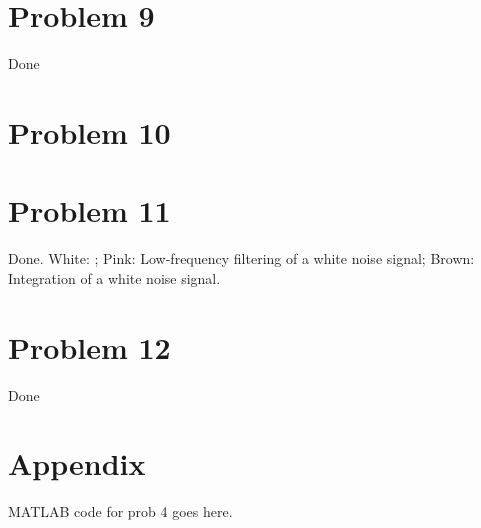 \documentclass[10pt]{article}
\begin{document}
\section{Problem 9}
Done
\section{Problem 10}
\section{Problem 11}
Done. White: ; Pink: Low-frequency filtering of a white noise signal; Brown: Integration of a white noise signal.
\section{Problem 12}
Done
\section*{Appendix}
MATLAB code for prob 4 goes here.
\end{document}
